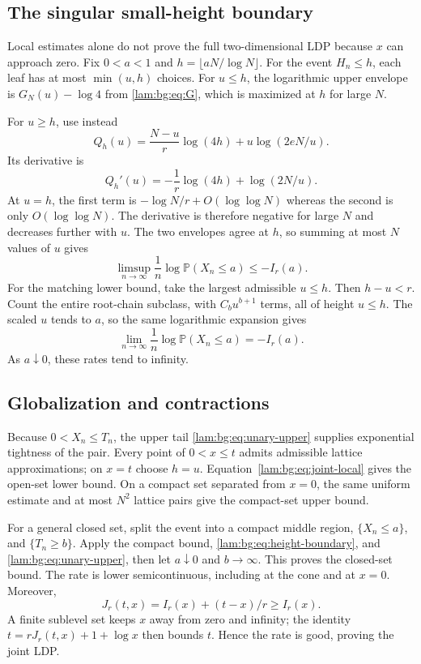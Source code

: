 \documentclass[11pt,a4paper]{article}
\numberwithin{equation}{section}
\theoremstyle{remark}
\newcommand{\Prob}{\mathbb P}
\begin{document}
\subsection{The singular small-height boundary}
Local estimates alone do not prove the full two-dimensional LDP because $x$ can approach zero. Fix $0<a<1$ and $h=\lfloor aN/\log N\rfloor$. For the event $H_n\le h$, each leaf has at most $\min(u,h)$ choices. For $u\le h$, the logarithmic upper envelope is $G_N(u)-\log4$ from \eqref{lam:bg:eq:G}, which is maximized at $h$ for large $N$.

For $u\ge h$, use instead
\[
 Q_h(u)=\frac{N-u}{r}\log(4h)+u\log(2eN/u).
\]
Its derivative is
\[
 Q_h'(u)=-\frac1r\log(4h)+\log(2N/u).
\]
At $u=h$, the first term is $-\log N/r+O(\log\log N)$ whereas the second is only $O(\log\log N)$. The derivative is therefore negative for large $N$ and decreases further with $u$. The two envelopes agree at $h$, so summing at most $N$ values of $u$ gives
\[
 \limsup_{n\to\infty}\frac1n\log\Prob(X_n\le a)\le-I_r(a).
\]
For the matching lower bound, take the largest admissible $u\le h$. Then $h-u<r$. Count the entire root-chain subclass, with $C_bu^{b+1}$ terms, all of height $u\le h$. The scaled $u$ tends to $a$, so the same logarithmic expansion gives
\begin{equation}\label{lam:bg:eq:height-boundary}
 \lim_{n\to\infty}\frac1n\log\Prob(X_n\le a)=-I_r(a).
\end{equation}
As $a\downarrow0$, these rates tend to infinity.

\subsection{Globalization and contractions}
Because $0<X_n\le T_n$, the upper tail \eqref{lam:bg:eq:unary-upper} supplies exponential tightness of the pair. Every point of $0<x\le t$ admits admissible lattice approximations; on $x=t$ choose $h=u$. Equation~\eqref{lam:bg:eq:joint-local} gives the open-set lower bound. On a compact set separated from $x=0$, the same uniform estimate and at most $N^2$ lattice pairs give the compact-set upper bound.

For a general closed set, split the event into a compact middle region, $\{X_n\le a\}$, and $\{T_n\ge b\}$. Apply the compact bound, \eqref{lam:bg:eq:height-boundary}, and \eqref{lam:bg:eq:unary-upper}, then let $a\downarrow0$ and $b\to\infty$. This proves the closed-set bound. The rate is lower semicontinuous, including at the cone and at $x=0$. Moreover,
\[
 J_r(t,x)=I_r(x)+(t-x)/r\ge I_r(x).
\]
A finite sublevel set keeps $x$ away from zero and infinity; the identity $t=rJ_r(t,x)+1+\log x$ then bounds $t$. Hence the rate is good, proving the joint LDP.
\end{document}
